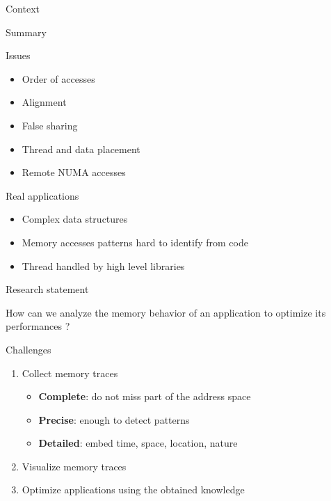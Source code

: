 \documentclass[xcolor={usenames,dvipsnames},hyperref={pdfusetitle}]{beamer}
\begin{document}
\begin{section}{Context}
\begin{frame}{Summary}
    \begin{block}{Issues}
        \begin{itemize}
            \item Order of accesses
            \item Alignment
            \item False sharing
            \item Thread and data placement
            \item Remote NUMA accesses
        \end{itemize}
    \end{block}
    \pause
    \begin{alertblock}{Real applications}
        \begin{itemize}
            \item Complex data structures
            \item Memory accesses patterns hard to identify from code
            \item Thread handled by high level libraries
        \end{itemize}
    \end{alertblock}
\end{frame}

\begin{frame}{Research statement}
    \begin{alertblock}{}
        How can we analyze the memory behavior of an application to optimize its performances ?
    \end{alertblock}
    \pause
    \begin{block}{Challenges}
        \begin{enumerate}
                \item<alert@+> Collect memory traces
                \begin{itemize}
                    \item \textbf{Complete}: do not miss part of the address space
                    \item \textbf{Precise}:  enough to detect patterns
                    \item \textbf{Detailed}: embed time, space, location, nature
                \end{itemize}
                \item<alert@+> Visualize memory traces
                \item<alert@+> Optimize applications using the obtained knowledge
        \end{enumerate}
    \end{block}
\end{frame}

\end{section}
\end{document}
